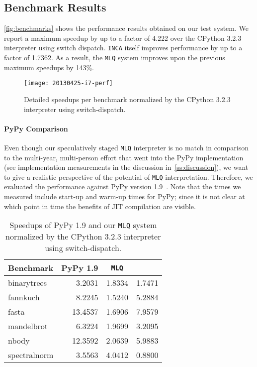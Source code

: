 \documentclass[preprint,10pt]{popl14conf}
\newcommand{\namasteMaxSU}{4.222}
\newcommand{\incaMaxSU}{1.7362}
\newcommand{\fasterThanINCA}{143\%}
\newcommand{\inca}{\texttt{INCA}}
\newcommand{\mlq}{\texttt{MLQ}}
\begin{document}
\subsection{Benchmark Results}\label{ss:benchmark-results}

\autoref{fig:benchmarks} shows the performance results obtained on our test system.
We report a maximum speedup by up to a factor of \namasteMaxSU{} over the CPython 3.2.3 interpreter
using switch dispatch.
\inca{} itself improves performance by up to a factor of \incaMaxSU{}.
As a result, the \mlq{} system improves upon the previous maximum speedups by \fasterThanINCA{}.

\begin{figure*}[t!]
  \centering
  \texttt{[image: 20130425-i7-perf]}
  \caption{Detailed speedups per benchmark normalized by the CPython 3.2.3 interpreter using
    switch-dispatch.}
  \label{fig:benchmarks}
\end{figure*}


\paragraph{PyPy Comparison}
Even though our speculatively staged \mlq{} interpreter is no match in comparison to the multi-year,
multi-person effort that went into the PyPy implementation (see implementation measurements in the
discussion in~\autoref{ss:discussion}), we want to give a realistic perspective of the potential of
\mlq{} interpretation.
Therefore, we evaluated the performance against PyPy version 1.9~\cite{pypy+13}.
Note that the times we measured include start-up and warm-up times for PyPy; since it is not clear
at which point in time the benefits of JIT compilation are visible.

\begin{table}[t!]
  \centering
  \begin{tabular}{|l|r|r|r|}
    \hline
    \multicolumn{1}{|c|}{Benchmark} & \multicolumn{1}{c|}{PyPy 1.9} & \multicolumn{1}{c|}{\mlq{}} & \multicolumn{1}{c|}{} \\
    \hline
    \hline
    \textsf{binarytrees}            & 3.2031                & 1.8334                    & 1.7471 \\
    \hline
    \textsf{fannkuch}               & 8.2245                & 1.5240                    & 5.2884 \\
    \hline
    \textsf{fasta}                  & 13.4537               & 1.6906                    & 7.9579 \\
    \hline
    \textsf{mandelbrot}             & 6.3224                & 1.9699                    & 3.2095 \\
    \hline
    \textsf{nbody}                  & 12.3592               & 2.0639                    & 5.9883 \\
    \hline
    \textsf{spectralnorm}           & 3.5563                & 4.0412                    & 0.8800 \\
    \hline
  \end{tabular}
  \caption{Speedups of PyPy 1.9 and our \mlq{} system normalized by the CPython 3.2.3 interpreter using switch-dispatch.\label{tab:pypy-speedups}}
\end{table}
\end{document}
